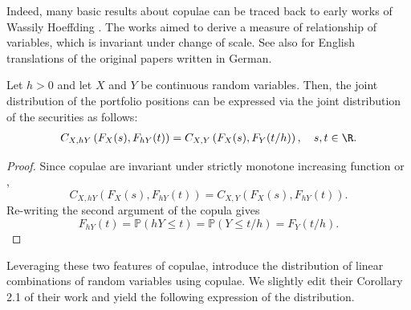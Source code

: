 Indeed, many basic results about copulae can be traced back to early
works of Wassily Hoeffding \citep{hoedffding1940, hoedffding1941}. 
The works aimed to derive a measure of relationship of variables,
which is invariant under change of scale. 
See also \citet{hoeffding2012collected} for English translations of
the original papers written in German. 

\begin{lemma}
  \label{lemma:copula}
  Let $h>0$ and let $X$ and $Y$ be continuous random variables. Then,
  the joint distribution of the portfolio positions 
  can be expressed via the joint distribution of the securities as
  follows:
  \begin{align}
  C_{X, hY}\left(F_X(s),F_{hY}(t)\right) = C_{X,
    Y}\left(F_X(s),F_{Y}(t/h)\right), \quad s,t\in \R.
    \end{align}
  \end{lemma}

\begin{proof}
  Since copulae are invariant under strictly monotone increasing
  function \cite[Theorem 3 (i)]{schweizer1981nonparametric} or
  \cite[Theorem 2.4.3]{Nelsen1999}, 
  \begin{equation*}
    C_{X, hY}\left(F_X(s),F_{hY}(t)\right) = C_{X, Y}\left(F_X(s),F_{hY}(t)\right).
    \end{equation*}
Re-writing the second argument of the copula gives
\begin{equation*}
  F_{hY}(t) = \mathbb{P}(hY \leq t)
  = \mathbb{P}(Y \leq t/h)
  = F_Y(t/h).
\end{equation*}
\end{proof}

Leveraging these two features of copulae, \citet{barbi2014copula}
introduce the distribution of linear combinations of random variables
using copulae. 
We slightly edit their Corollary 2.1 of their work and yield the 
following expression of the distribution. 

